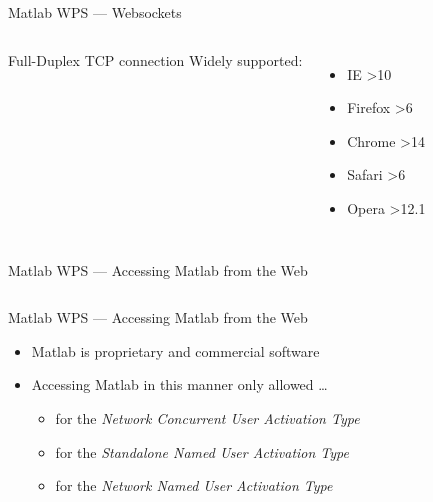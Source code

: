 \documentclass[xcolor=svgnames,professionalfonts,11pt,aspectratio=43]{beamer}
\begin{document}
\begin{frame}[c,fragile]{Matlab WPS --- Websockets}
  \begin{columns}
    
    \pause
    
  \end{columns}
  \pause
  \begin{columns}
  Full-Duplex TCP connection
  \pause
  Widely supported:
  \begin{itemize}
    \item IE \textgreater10
    \item Firefox \textgreater6
    \item Chrome \textgreater14
    \item Safari \textgreater6
    \item Opera \textgreater12.1
  \end{itemize}
  \end{columns}
\end{frame}

\begin{frame}[c,fragile]{Matlab WPS --- Accessing Matlab from the Web}
  \begin{columns}
    
    \pause
    
    \pause
    
  \end{columns}
\end{frame}

\begin{frame}[t]{Matlab WPS --- Accessing Matlab from the Web}
  \begin{itemize}
    \item Matlab is proprietary and commercial software
    \pause
    \item Accessing Matlab in this manner only allowed \dots
    \begin{itemize}
      \item for the \emph{Network Concurrent User Activation Type}
      \pause
      \item for the \emph{Standalone Named User Activation Type}
      \item for the \emph{Network Named User Activation Type}
    \end{itemize}
  \end{itemize}
\end{frame}
\end{document}
